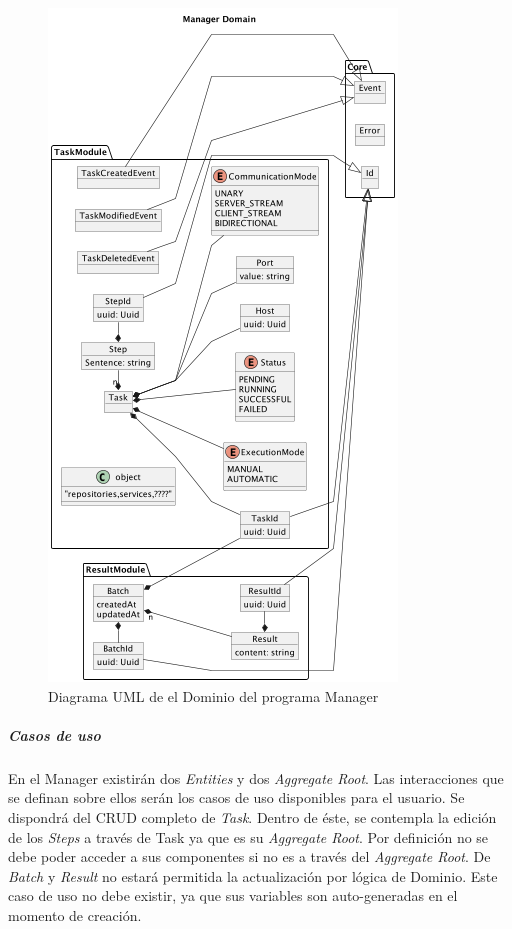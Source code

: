 \begin{figure}[H]
    \centering
    \includegraphics[height=0.5\textheight]{./part/Proyecto_ejecutivo/memoria_descriptiva/descripcionDelProyecto/manager/uml/managerDomain}
    \caption{Diagrama UML de el Dominio del programa Manager}\label{fig:Diagrama UML de el Dominio de manager}
\end{figure}

\subparagraph{Casos de uso}

En el Manager existirán dos \textit{Entities} y dos \textit{Aggregate Root}.
Las interacciones que se definan sobre ellos serán los casos de uso disponibles para el usuario.
Se dispondrá del \gls{CRUD} completo de \textit{Task}.
Dentro de éste, se contempla la edición de los \textit{Steps} a través de Task ya que es su \textit{Aggregate Root}.
Por definición no se debe poder acceder a sus componentes si no es a través del \textit{Aggregate Root}.
De \textit{Batch} y \textit{Result} no estará permitida la actualización por lógica de Dominio.
Este caso de uso no debe existir, ya que sus variables son auto-generadas en el momento de creación.

